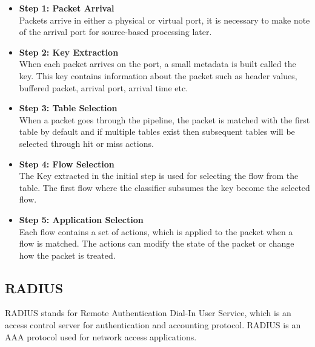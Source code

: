 \begin{itemize}
	\item \textbf{Step 1: Packet Arrival}
	\\ Packets arrive in either a physical or virtual port, it is necessary to make note of the arrival port for source-based processing later.
	\item \textbf{Step 2: Key Extraction}
	\\ When each packet arrives on the port, a small metadata is built called the key. This key contains information about the packet such as header values, buffered packet, arrival port, arrival time etc. 

	\item \textbf{Step 3: Table Selection}
	\\ When a packet goes through the pipeline, the packet is matched with the first table by default and if multiple tables exist then subsequent tables will be selected through hit or miss actions.
	\item \textbf{Step 4: Flow Selection}
	\\ The Key extracted in the initial step is used for selecting the flow from the table. The first flow where the classifier subsumes the key become the selected flow.
	\item \textbf{Step 5: Application Selection}
	\\ Each flow contains a set of actions, which is applied to the packet when a flow is matched. The actions can modify the state of the packet or change how the packet is treated. 
	
\end{itemize}

\subsection{RADIUS \cite{RADIUS_RFC2865}} \label{RADIUS}
RADIUS stands for Remote Authentication Dial-In User Service, which is an access control server for authentication and accounting protocol. RADIUS is an AAA protocol used for network access applications.
